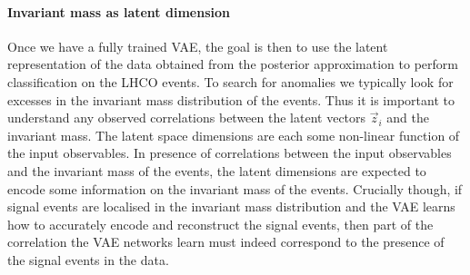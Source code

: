 \documentclass[a4paper,11pt]{article}
\begin{document}
\paragraph{Invariant mass as latent dimension}

\noindent Once we have a fully trained VAE, the goal is then to use the latent representation of the data obtained from the posterior approximation to perform classification on the LHCO events.
To search for anomalies we typically look for excesses in the invariant mass distribution of the events. Thus it is important to understand any observed correlations between the latent vectors $\vec{z}_i$ and the invariant mass.
The latent space dimensions are each some non-linear function of the input observables.
In presence of correlations between the input observables and the invariant mass of the events, the latent dimensions are expected to encode some information on the invariant mass of the events. 
Crucially though, if signal events are localised in the invariant mass distribution and the VAE learns how to accurately encode and reconstruct the signal events, then part of the correlation the VAE networks learn must indeed correspond to the presence of the signal events in the data.
\end{document}
